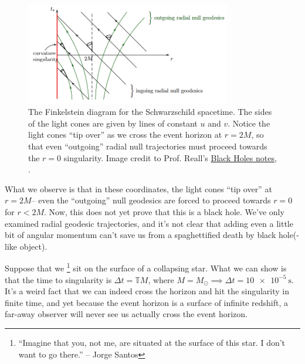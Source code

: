 \begin{figure}
    \centering
    \includegraphics[width=0.8\textwidth]{2019/01/20190124_reall_finkelsteindiagram.png}
    \caption{
    The Finkelstein diagram for the Schwarzschild spacetime. The sides of the light cones are given by lines of constant $u$ and $v$. Notice the light cones ``tip over'' as we cross the event horizon at $r=2M$, so that even ``outgoing'' radial null trajectories must proceed towards the $r=0$ singularity.
    \newline
    Image credit to Prof. Reall's  \href{http://www.damtp.cam.ac.uk/user/hsr1000/black_holes_lectures_2016.pdf}{Black Holes notes}, .
    }
    \label{fig:reall_finkelsteindiagram}
\end{figure}

What we observe is that in these coordinates, the light cones ``tip over'' at $r=2M$-- even the ``outgoing'' null geodesics are forced to proceed towards $r=0$ for $r<2M$. Now, this does not yet prove that this is a black hole. We've only examined radial geodesic trajectories, and it's not clear that adding even a little bit of angular momentum can't save us from a spaghettified death by black hole(-like object).
%

Suppose that we%
    \footnote{``Imagine that you, not me, are situated at the surface of this star. I don't want to go there.'' -- Jorge Santos
    }
sit on the surface of a collapsing star. What we can show is that the time to singularity is $\Delta t = \mathbb{T} M$, where $M=M_\odot \implies \Delta t= \SI{10e-5}{\second}.$ It's a weird fact that we can indeed cross the horizon and hit the singularity in finite time, and yet because the event horizon is a surface of infinite redshift, a far-away observer will never see us actually cross the event horizon.

